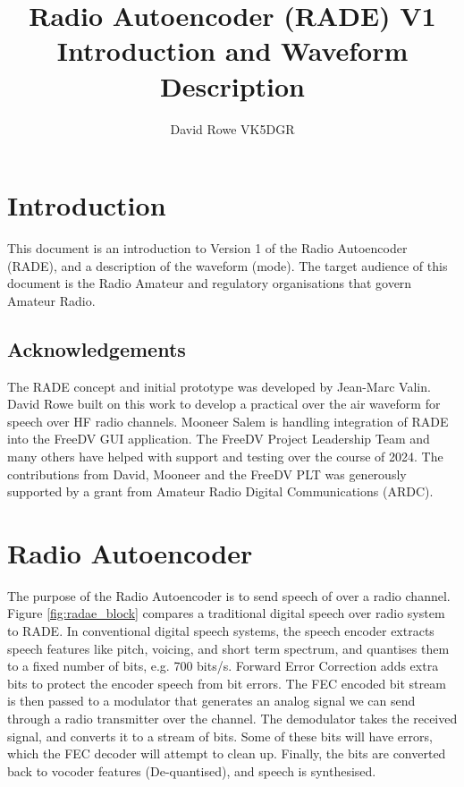 \documentclass{article}
\begin{document}


\title{Radio Autoencoder (RADE) V1 Introduction and Waveform Description}
\author{David Rowe VK5DGR}
\date{}
\maketitle

\section{Introduction}

This document is an introduction to Version 1 of the Radio Autoencoder (RADE), and a description of the waveform (mode). The target audience of this document is the Radio Amateur and regulatory organisations that govern Amateur Radio.

\subsection{Acknowledgements}

The RADE concept and initial prototype was developed by Jean-Marc Valin. David Rowe built on this work to develop a practical over the air waveform for speech over HF radio channels.  Mooneer Salem is handling integration of RADE into the FreeDV GUI application. The FreeDV Project Leadership Team and many others have helped with support and testing over the course of 2024. The contributions from David, Mooneer and the FreeDV PLT was generously supported by a grant from Amateur Radio Digital Communications (ARDC).

\section{Radio Autoencoder}

The purpose of the Radio Autoencoder is to send speech of over a radio channel. Figure \ref{fig:radae_block} compares a traditional digital speech over radio system to RADE.
In conventional digital speech systems, the speech encoder extracts speech features like pitch, voicing, and short term spectrum, and quantises them to a fixed number of bits, e.g. 700 bits/s.  Forward Error Correction adds extra bits to protect the encoder speech from bit errors.  The FEC encoded bit stream is then passed to a modulator that generates an analog signal we can send through a radio transmitter over the channel.  The demodulator takes the received signal, and converts it to a stream of bits.  Some of these bits will have errors, which the FEC decoder will attempt to clean up.  Finally, the bits are converted back to vocoder features (De-quantised), and speech is synthesised.
\end{document}
